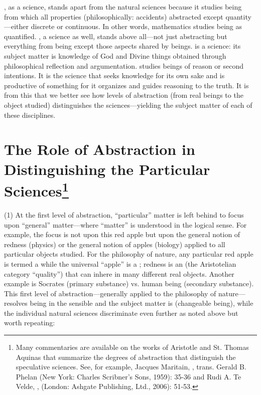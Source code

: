 , as a science, stands apart from the natural sciences because it studies being from which all properties (philosophically: accidents) abstracted except quantity---either discrete or continuous. In other words, mathematics studies being as quantified. , a science as well, stands above all---not just abstracting but  everything from being except those aspects shared by  beings.  is a science: its subject matter is knowledge of God and Divine things obtained through philosophical reflection and argumentation.  studies beings of reason or second intentions. It is the science that seeks knowledge for its own sake and is productive of something for it organizes and guides reasoning to the truth. It is from this that we better see how levels of abstraction (from real beings to the object studied) distinguishes the sciences---yielding the subject matter of each of these disciplines.


\section[The Role of Abstraction]{The Role of Abstraction in Distinguishing the Particular Sciences\footnote{Many commentaries are available on the works of Aristotle and St. Thomas Aquinas that summarize the degrees of abstraction that distinguish the speculative sciences. See, for example, Jacques Maritain, , trans. Gerald B. Phelan (New York: Charles Scribner's Sons, 1959): 35-36 and Rudi A. Te Velde, , (London: Ashgate Publishing, Ltd., 2006): 51-53.}}

(1) At the first level of abstraction, ``particular'' matter is left behind to focus upon ``general'' matter---where ``matter'' is understood in the logical sense. For example, the focus is not upon this red apple but upon the general notion of redness (physics) or the general notion of apples (biology)  applied to all particular objects studied. For the philosophy of nature, any particular red apple is termed a  while the universal ``apple'' is a ; redness is an  (the Aristotelian category ``quality'') that can inhere in many different real objects. Another example is Socrates (primary substance) vs. human being (secondary substance). This first level of abstraction---generally applied to the philosophy of nature---resolves being in the sensible and the subject matter is  (changeable being), while the individual natural sciences discriminate even further as noted above but worth repeating:

